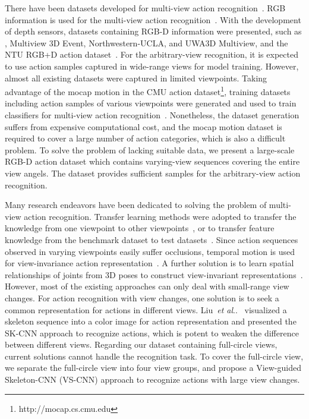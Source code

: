 \documentclass[journal]{IEEEtran}
\makeatletter
\DeclareRobustCommand\onedot{\futurelet\@let@token\@onedot}
\def\@onedot{\ifx\@let@token.\else.\null\fi\xspace}
\def\etal{\emph{et al}\onedot}
\makeatother
\begin{document}
There have been datasets developed for multi-view action recognition~\cite{IXMAS2006}. RGB information is used for the multi-view action recognition~\cite{IXMAS2007,LiuTransfer2011}. With the development of depth sensors, datasets containing RGB-D information were presented, such as , Multiview 3D Event, Northwestern-UCLA, and UWA3D Multiview, and the NTU RGB+D action dataset~\cite{ChengACT42012,Wei4DHOI2013,WangMSTAOG2014,RahmaniUWA3D2016,ShahroudyNTU2016}. For the arbitrary-view recognition, it is expected to use action samples captured in wide-range views for model training. However, almost all existing datasets were captured in limited viewpoints. Taking advantage of the mocap motion in the CMU action dataset\footnote{http://mocap.cs.cmu.edu}, training datasets including action samples of various viewpoints were generated and used to train classifiers for multi-view action recognition~\cite{Gupta3Dpose2014,RahmaniNKTM2015,RahmaniNovelV2016}. Nonetheless, the dataset generation suffers from expensive computational cost, and the mocap motion dataset is required to cover a large number of action categories, which is also a difficult problem.
To solve the problem of lacking suitable data, we present a large-scale RGB-D action dataset which contains varying-view sequences covering the entire  view angels. The dataset provides sufficient samples for the arbitrary-view action recognition.


Many research endeavors have been dedicated to solving the problem of multi-view action recognition. Transfer learning methods were adopted to transfer the knowledge from one viewpoint to other viewpoints~\cite{Rybok2011,Li2012,Zhang2013,M2Ibenchmark2016,GaoCollab2017}, or to transfer feature knowledge from the benchmark dataset to test datasets~\cite{LiuTransfer2011}. Since action sequences observed in varying viewpoints easily suffer occlusions, temporal motion is used for view-invariance action representation~\cite{ShahroudyNTU2016,InteractionJi2015,Wei4DHOI2013}. A further solution is to learn spatial relationships of joints from 3D poses to construct view-invariant representations~\cite{RahmaniHOPC2014,WangActionlet2013,Ji2017One}. However, most of the existing approaches can only deal with small-range view changes. For action recognition with view changes, one solution is to seek a common representation for actions in different views. Liu~\etal~\cite{EnhancedSK2017} visualized a skeleton sequence into a color image for action representation and presented the SK-CNN approach to recognize actions, which is potent to weaken the difference between different views. Regarding our dataset containing full-circle views, current solutions cannot handle the recognition task. To cover the full-circle view, we separate the full-circle view into four view groups, and propose a View-guided Skeleton-CNN (VS-CNN) approach to recognize actions with large view changes.
\end{document}
